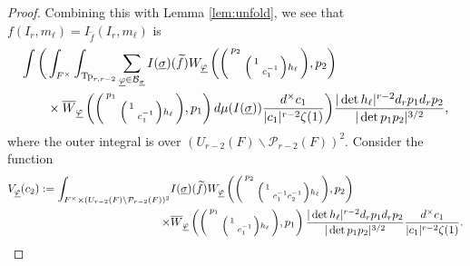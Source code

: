 \documentclass[12pt]{amsart}
\theoremstyle{remark}
\numberwithin{equation}{section}
\theoremstyle{definition}
\newenvironment{psmatrix}
  {\left(\begin{smallmatrix}}
  {\end{smallmatrix}\right)}
\numberwithin{equation}{subsection}
\begin{document}
\begin{proof}
 Combining this with Lemma \ref{lem:unfold}, we see that $f(I_r,m_{\ell})=I_{\widetilde{f}}(I_r,m_{\ell})$ is
\begin{align} \label{before:d1} \begin{split}
    \int\bigg(&\int_{F^\times}  \int_{\mathrm{Tp}_{r,r-2}} \sum_{\underline{\varphi} \in \mathcal{B}_{\underline{\sigma}}}  
I(\underline{\sigma})(\widetilde{f})W_{\underline{\varphi}}\left(\begin{psmatrix} p_2 & \\ & \begin{psmatrix} 1 & \\ & c_1^{-1}\end{psmatrix}h_\ell\end{psmatrix},p_2\right)\\& \times 
\overline{W}_{\underline{\varphi}}\left(\begin{psmatrix} p_1 & \\ & \begin{psmatrix} 1 & \\ & c_1^{-1}\end{psmatrix}h_\ell\end{psmatrix},p_1\right)
d\mu(I(\underline{\sigma})) \frac{d^\times c_1}{|c_1|^{r-2}\zeta(1)}\bigg)\frac{|\det h_\ell|^{r-2}d_r p_1d_r p_2}{|\det p_1p_2|^{3/2}},\end{split}
\end{align}
where the outer integral is over ${(U_{r-2}(F) \backslash \mathcal{P}_{r-2}(F))^2}.$ Consider the function 
\begin{align*}
    V_{\underline{\varphi}}(c_2):=\int_{F^\times \times (U_{r-2}(F) \backslash \mathcal{P}_{r-2}(F))^2}&I(\underline{\sigma})(\widetilde{f})W_{\underline{\varphi}}\left(\begin{psmatrix} p_2 & \\ & \begin{psmatrix} 1 & \\ & c_1^{-1}c_2^{-1}\end{psmatrix}h_\ell\end{psmatrix},p_2\right)\\ \times & 
\overline{W}_{\underline{\varphi}}\left(\begin{psmatrix} p_1 & \\ & \begin{psmatrix} 1 & \\ & c_1^{-1}\end{psmatrix}h_\ell\end{psmatrix},p_1\right)
\frac{|\det h_\ell|^{r-2}d_r p_1d_r p_2}{|\det p_1p_2|^{3/2}}\frac{d^\times c_1}{|c_1|^{r-2}\zeta(1)}.

\end{align*}
\end{proof}
\end{document}
